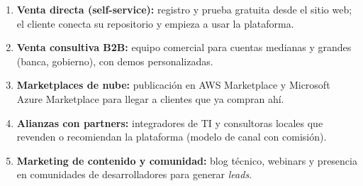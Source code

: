 \begin{enumerate}
  \item \textbf{Venta directa (self-service):} registro y prueba gratuita desde el
        sitio web; el cliente conecta su repositorio y empieza a usar la plataforma.
  \item \textbf{Venta consultiva B2B:} equipo comercial para cuentas medianas y grandes
        (banca, gobierno), con demos personalizadas.
  \item \textbf{Marketplaces de nube:} publicación en AWS Marketplace y Microsoft Azure
        Marketplace para llegar a clientes que ya compran ahí.
  \item \textbf{Alianzas con partners:} integradores de TI y consultoras locales que
        revenden o recomiendan la plataforma (modelo de canal con comisión).
  \item \textbf{Marketing de contenido y comunidad:} blog técnico, webinars y presencia
        en comunidades de desarrolladores para generar \emph{leads}.
\end{enumerate}
